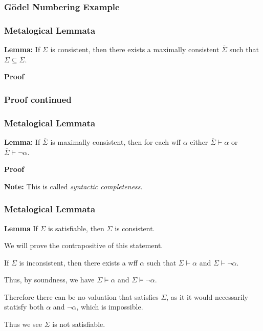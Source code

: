 \documentclass{beamer}
\theoremstyle{indentDefn} \newtheorem{defn}[]{Definition}
\begin{document}
\begin{frame}
	\frametitle{G\"{o}del Numbering Example}
\end{frame}

\begin{frame}
	\frametitle{Metalogical Lemmata}
	
	{\bf Lemma:} If $\Sigma$ is consistent, then there exists a maximally consistent $\overline{\Sigma}$ such that $\Sigma \subseteq \overline{\Sigma}$.
	
	{\bf Proof}
	
	\vspace{7cm}
	
\end{frame}

\begin{frame}
	\frametitle{Proof continued}
\end{frame}

\begin{frame}
	\frametitle{Metalogical Lemmata}
	
	{\bf Lemma:} If $\overline{\Sigma}$ is maximally consistent, then for each wff $\alpha$ either $\overline{\Sigma} \vdash \alpha$ or $\overline{\Sigma} \vdash \lnot \alpha$. 

	{\bf Proof}
	
	\vspace{6cm}
	
	{\bf Note:} This is called \emph{syntactic completeness}. 
	
\end{frame}

\begin{frame}
	\frametitle{Metalogical Lemmata}
	
	{\bf Lemma} If $\Sigma$ is satisfiable, then $\Sigma$ is consistent.
	
	\vspace{0.5cm}
	
	 We will prove the contrapositive of this statement. 
	
	\vspace{0.5cm}
	
	If $\Sigma$ is inconsistent, then there exists a wff $\alpha$ such that $\Sigma \vdash \alpha$ and $\Sigma \vdash \lnot\alpha$.
	 
	\vspace{0.5cm}
	
	Thus, by soundness, we have $\Sigma \vDash \alpha$ and $\Sigma \vDash \lnot\alpha$. 
	
	\vspace{0.5cm}
	
	Therefore there can be no valuation that satisfies $\Sigma$, as it it would necessarily statisfy both $\alpha$ and $\lnot \alpha$, which is impossible. 
	
	\vspace{0.5cm}
	
	Thus we see $\Sigma$ is not satisfiable. 
	
\end{frame}
\end{document}
